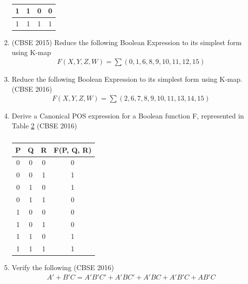 \begin{enumerate}
\begin{table}[!ht]
\begin{tabular}{|c|c|c|c|}
\hline
1 & 1 & 0 & 0 \\
\hline
1 & 1 & 1 & 1 \\
\hline
\end{tabular}
		\caption{}
\label{tab:2015-1/c/6/c}
\end{table}
	\item 
\label{prob:2015/c/6/d}
\hfill (CBSE 2015)
		Reduce the following Boolean Expression to its simplest form using K-map
		\begin{align}
\label{eq:2015/c/6/d}
F(X,Y,Z,W)= \sum (0,1,6,8,9,10,11,12,15)
		\end{align}
	\item Reduce the following Boolean Expression to its simplest form using K-map.
\label{prob:2016/c/6/d}
\hfill (CBSE 2016)
		\begin{align}
\label{eq:2016/c/6/d}
			F(X,Y,Z,W)= \sum(2,6,7,8,9,10,11,13,14,15)
		\end{align}
	\item Derive a Canonical POS expression for a Boolean function  F, represented in Table
\ref{tab:2016/c/6/c}
\hfill (CBSE 2016)
\label{prob:2016/c/6/c}
		\begin{table}[!ht]
			\centering
			\begin{tabular}{|c|c|c|c|}

 \hline
 P & Q & R & F(P,  Q,  R) \\
 \hline
 0  & 0  & 0 & 0  \\
\hline
0  & 0  & 1 & 1  \\
\hline
0  & 1  & 0 & 1  \\
\hline
0  & 1  & 1 & 0  \\
\hline
1  & 0  & 0 & 0  \\
\hline
1  & 0  & 1 & 0  \\
\hline
1  & 1  & 0 & 1  \\
\hline
1  & 1  & 1 & 1  \\
\hline
\end{tabular}
			\caption{}
\label{tab:2016/c/6/c}
		\end{table}
	\item Verify the following 
\hfill (CBSE 2016)
\label{prob:2016/c/6/a}
		\begin{align}
\label{eq:2016/c/6/a}
A'+B'C = A'B'C' + A'BC' + A'BC + A'B'C + AB'C
		\end{align}



\end{enumerate}
